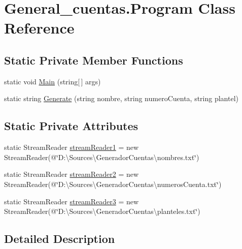 \hypertarget{class_general__cuentas_1_1_program}{\section{General\-\_\-cuentas.\-Program Class Reference}
\label{class_general__cuentas_1_1_program}
}
\subsection*{Static Private Member Functions}
\begin{DoxyCompactItemize}
\item 
static void \hyperlink{class_general__cuentas_1_1_program_a65de6462670c43847c79d750fe64b817}{Main} (string\mbox{[}$\,$\mbox{]} args)
\item 
static string \hyperlink{class_general__cuentas_1_1_program_a1ca37b8c6158c753bb77f8ecfa694c00}{Generate} (string nombre, string numero\-Cuenta, string plantel)
\end{DoxyCompactItemize}
\subsection*{Static Private Attributes}
\begin{DoxyCompactItemize}
\item 
static Stream\-Reader \hyperlink{class_general__cuentas_1_1_program_a0af8127c156f60c5b3dcaf870b8a3e95}{stream\-Reader1} = new Stream\-Reader(@\char`\"{}D\-:\textbackslash{}\-Sources\textbackslash{}\-Generador\-Cuentas\textbackslash{}nombres.\-txt\char`\"{})
\item 
static Stream\-Reader \hyperlink{class_general__cuentas_1_1_program_ae5b014ec3c416ce64f622ba554226c7d}{stream\-Reader2} = new Stream\-Reader(@\char`\"{}D\-:\textbackslash{}\-Sources\textbackslash{}\-Generador\-Cuentas\textbackslash{}numeros\-Cuenta.\-txt\char`\"{})
\item 
static Stream\-Reader \hyperlink{class_general__cuentas_1_1_program_a558196b9a618e6a6fb5ac25915910e96}{stream\-Reader3} = new Stream\-Reader(@\char`\"{}D\-:\textbackslash{}\-Sources\textbackslash{}\-Generador\-Cuentas\textbackslash{}planteles.\-txt\char`\"{})
\end{DoxyCompactItemize}


\subsection{Detailed Description}


